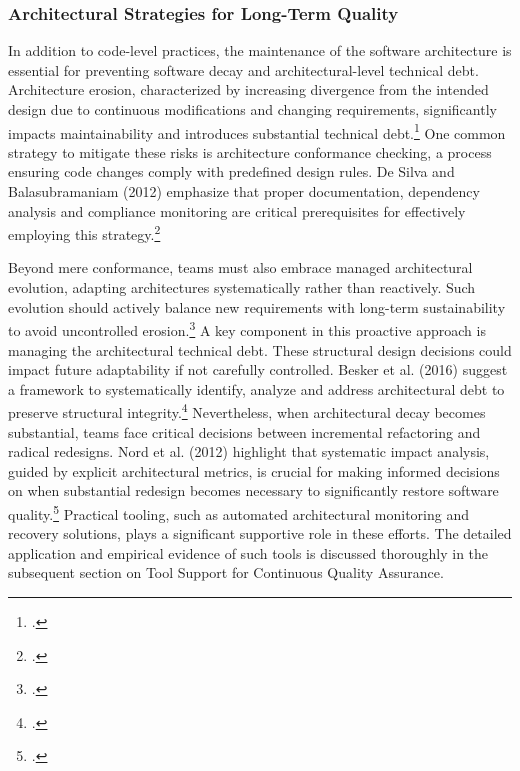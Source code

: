 \subsubsection{Architectural Strategies for Long-Term Quality}
In addition to code-level practices, the maintenance of the software architecture is essential for preventing software decay and architectural-level technical debt. 
Architecture erosion, characterized by increasing divergence from the intended design due to continuous modifications and changing requirements,
significantly impacts maintainability and introduces substantial technical debt.\footcite[1]{desilvaControllingSoftwareArchitecture2012}
One common strategy to mitigate these risks is architecture conformance checking, a process ensuring code changes comply with predefined design rules.
De Silva and Balasubramaniam (2012) emphasize that proper documentation, dependency analysis and compliance monitoring are critical prerequisites for
effectively employing this strategy.\footcite[135]{desilvaControllingSoftwareArchitecture2012}

Beyond mere conformance, teams must also embrace managed architectural evolution, adapting architectures systematically rather than reactively. Such evolution
should actively balance new requirements with long-term sustainability to avoid uncontrolled erosion.\footcite[34]{liUnderstandingSoftwareArchitecture2022}
A key component in this proactive approach is managing the architectural technical debt. These structural design decisions could impact future adaptability if not
carefully controlled. Besker et al. (2016) suggest a framework to systematically identify, analyze and address architectural debt to preserve structural integrity.\footcite[11]{beskerManagingArchitecturalTechnical2018}
Nevertheless, when architectural decay becomes substantial, teams face critical decisions between incremental refactoring and radical redesigns.
Nord et al. (2012) highlight that systematic impact analysis, guided by explicit architectural metrics, is crucial for making informed decisions on when substantial 
redesign becomes necessary to significantly restore software quality.\footcite[99]{nordSearchMetricManaging2012}
Practical tooling, such as automated architectural monitoring and recovery solutions, plays a significant supportive role in these efforts. 
The detailed application and empirical evidence of such tools is discussed thoroughly in the subsequent section on Tool Support for Continuous Quality Assurance.

